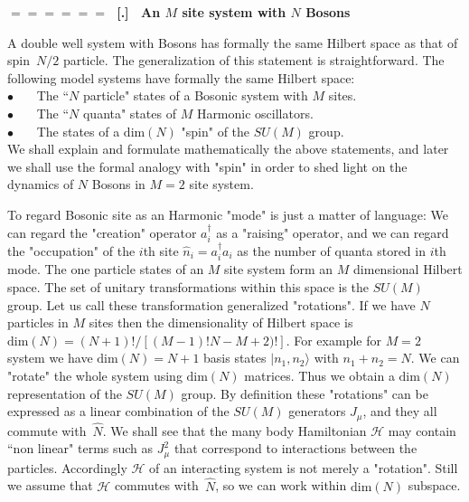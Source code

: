 \documentclass[onecolumn,fleqn]{revtex4}
\newcommand{\bitem}{$\bullet$ \ \ \ }
\renewcommand{\thesubsection}{\arabic{subsection}}
\renewcommand{\thesubsubsection}{\arabic{subsubsection}}
\newcommand{\sheadC}[1]
{
\addtocounter{subsubsection}{1}
\vspace{5mm}
{\Large\bf $=\!=\!=\!=\!=\!=\;$ [\thesubsection.\thesubsubsection] \ #1}  
\nopagebreak
\phantomsection
}
\begin{document}
\sheadC{An $M$ site system with $N$ Bosons}

A double well system with Bosons has formally the same Hilbert space 
as that of spin~$N/2$ particle. 
The generalization of this statement is straightforward.   
The following model systems have formally the same Hilbert space: \\
 
\bitem The ``$N$ particle" states of a Bosonic system with $M$ sites. \\
\bitem The ``$N$ quanta" states of $M$ Harmonic oscillators. \\
\bitem The states of a $\mbox{dim}(N)$ "spin" of the $SU(M)$ group. \\

We shall explain and formulate mathematically the above statements, 
and later we shall use the formal analogy with "spin" in order to shed 
light on the dynamics of $N$ Bosons in ${M=2}$ site system. 

To regard Bosonic site as an Harmonic "mode"  
is just a matter of language: 
We can regard the "creation" operator $a_i^{\dagger}$
as a "raising" operator, and we can regard the "occupation" 
of the $i$th site $\hat{n}_i= a_i^{\dagger}a_i$ 
as the number of quanta stored in $i$th mode. 
The one particle states of an $M$ site system form 
an $M$ dimensional Hilbert space. The set of unitary 
transformations within this space is the $SU(M)$ group.
Let us call these transformation generalized "rotations". 
If we have $N$ particles in $M$ sites then 
the dimensionality of Hilbert space is ${\mbox{dim}(N)=(N{+}1)!/[(M{-}1)!N{-}M{+}2)!]}$.
For example for $M=2$ system we have ${\mbox{dim}(N)=N{+}1}$ 
basis states ${|n_1,n_2\rangle}$ with ${n_1+n_2=N}$. 
We can "rotate" the whole system using $\mbox{dim}(N)$
matrices. Thus we obtain a $\mbox{dim}(N)$ representation of the $SU(M)$ group. 
By definition these "rotations" can be expressed as a linear combination 
of the $SU(M)$ generators $J_{\mu}$, and they all commute with~$\hat{N}$.
We shall see that the many body Hamiltonian $\mathcal{H}$ may contain ``non linear" 
terms such as ${J_{\mu}^2}$ that correspond to interactions 
between the particles. Accordingly $\mathcal{H}$ of an interacting 
system is not merely a "rotation". 
Still we assume that $\mathcal{H}$ commutes with~$\hat{N}$, 
so we can work within $\mbox{dim}(N)$ subspace.
\end{document}
